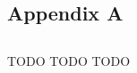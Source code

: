 \documentclass{article}
\begin{document}
\begin{appendices}
	
\section{Appendix A}
\subsection{}
\label{appendix:A.1}
TODO TODO TODO

\end{appendices}
\end{document}
